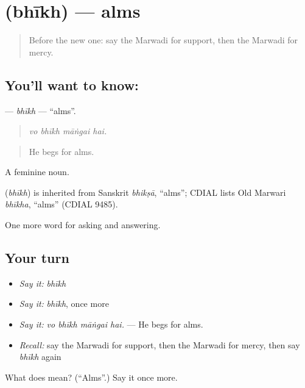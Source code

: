\section[\texorpdfstring{\mw{भीख} (bhīkh)}{भीख (bhīkh)}]{ (bhīkh) — alms}

\label{lesson:MW-C274-bhikh}



\begin{quote}
Before the new one: say the Marwadi for support, then the Marwadi for mercy.
\end{quote}

\subsection*{You'll want to know: }
\textbf{} — \emph{bhīkh} — \textquotedblleft{}alms\textquotedblright{}.

\begin{quote}
   
\end{quote}

\begin{quote}
\emph{vo bhīkh māṅgai hai.}
\end{quote}

\begin{quote}
He begs for alms.
\end{quote}

A feminine noun.

\begin{cousinweb}
\textbf{} (\emph{bhīkh}) is inherited from Sanskrit \emph{bhikṣā}, \textquotedblleft{}alms\textquotedblright{}; CDIAL lists Old Marwari \emph{bhīkha}, \textquotedblleft{}alms\textquotedblright{} (CDIAL 9485).
\end{cousinweb}

\begin{grammarlens}[title={What you've built}]
One more word for asking and answering.
\end{grammarlens}

\subsection*{Your turn}
\begin{itemize}
\raggedright
  \item \emph{Say it:} \emph{bhīkh}
  \item \emph{Say it:} \emph{bhīkh}, once more
  \item \emph{Say it:} \emph{vo bhīkh māṅgai hai.} — He begs for alms.
  \item \emph{Recall:} say the Marwadi for support, then the Marwadi for mercy, then say \emph{bhīkh} again
\end{itemize}

\begin{tcolorbox}[breakable,colback=teal!4,colframe=teal!35!black,title={Before you move on}]
What does  mean? (\textquotedblleft{}Alms\textquotedblright{}.) Say it once more.
\end{tcolorbox}
